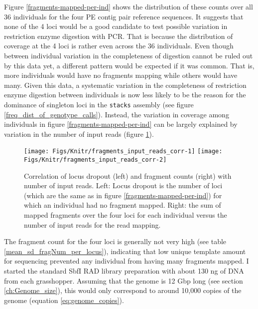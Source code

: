 \documentclass[a4paper,12pt,times,authoryear,twoside,print,index]{Classes/PhDThesisPSnPDF}\usepackage[]{graphicx}\usepackage[]{color}
\newenvironment{knitrout}{}{} %
\begin{document}
Figure \ref{fragments-mapped-per-ind} shows the distribution of these counts over all 36 individuals for the four PE contig pair reference sequences. It suggests that none of the 4 loci would be a good candidate to test possible variation in restriction enzyme digestion with PCR. That is because the distribution of coverage at the 4 loci is rather even across the 36 individuals. Even though between individual variation in the completeness of digestion cannot be ruled out by this data yet, a different pattern would be expected if it was common. That is, more individuals would have no fragments mapping while others would have many. Given this data, a systematic variation in the completeness of restriction enzyme digestion between individuals is now less likely to be the reason for the dominance of singleton loci in the \texttt{stacks} assembly (see figure \ref{freq_dist_of_genotype_calls}). Instead, the variation in coverage among individuals in figure \ref{fragments-mapped-per-ind} can be largely explained by variation in the number of input reads (figure \ref{frag_input_corr_fig}).
%
\begin{figure}
\begin{knitrout}
\color{fgcolor}

{\centering \texttt{[image: Figs/Knitr/fragments\_input\_reads\_corr-1]} 
\texttt{[image: Figs/Knitr/fragments\_input\_reads\_corr-2]} 

}



\end{knitrout}
\caption{Correlation of locus dropout (left) and fragment counts (right) with number of input reads. Left: Locus dropout is the number of loci (which are the same as in figure \ref{fragments-mapped-per-ind}) for which an individual had no \gls{fragment} mapped. Right: the sum of mapped \glspl{fragment} over the four loci for each individual versus the number of input reads for the read mapping.}
\label{frag_input_corr_fig}
\end{figure}

The \gls{fragment} count for the four loci is generally not very high (see table \ref{mean_sd_fragNum_per_locus}), indicating that low unique template amount for sequencing prevented any individual from having many fragments mapped. I started the standard SbfI RAD library preparation with about 130 ng of DNA from each grasshopper. Assuming that the genome is 12 Gbp long (see section \ref{ch:Genome_size}), this would only correspond to around 10,000 copies of the genome (equation \ref{eq:genome_copies}).
\end{document}
